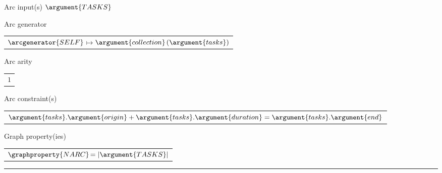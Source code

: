 \begin{ctrdesc}
 \clearpage
\colorbox{MyAzurelight}{\begin{minipage}[t]{11.2cm}
\colorbox{MyAzurelight}{\begin{minipage}[t]{11.2cm}
\item[Arc input(s)]
\hypertarget{CcumulativePgraph}{}
$\argument{TASKS}$
\item[Arc generator]
\begin{tabular}[t]{l}
$ $\hyperlink{AG_SELF}{$\arcgenerator{SELF}$}$ \mapsto  $\hyperlink{DT_collection}{$\argument{collection}$}$ (\argument{tasks})$\\
\end{tabular}
\item[Arc arity]
\begin{tabular}[t]{l}
$1$\\
\end{tabular}
\item[Arc constraint(s)]
\begin{tabular}[t]{l}
$\argument{tasks}.\argument{origin}+\argument{tasks}.\argument{duration}=\argument{tasks}.\argument{end}$\\
\end{tabular}
\item[Graph property(ies)]
\begin{tabular}[t]{l}
$ $\hyperlink{GC_NARC}{$\graphproperty{NARC}$}$ =|\argument{TASKS}|$\\
\end{tabular}
\hrule

\end{minipage}}


\end{minipage}}
\end{ctrdesc}
